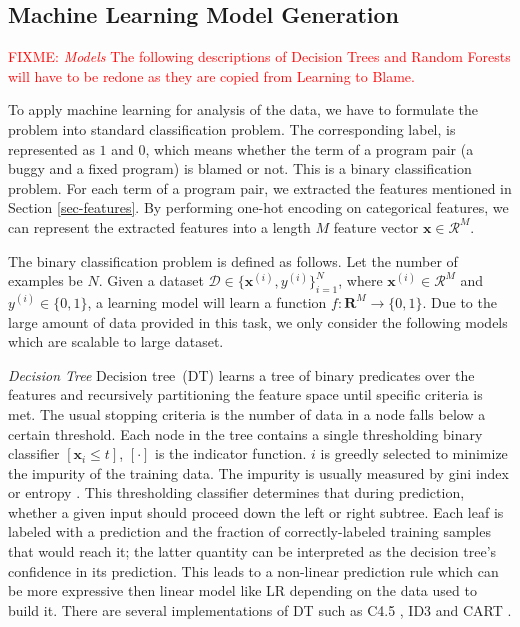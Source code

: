 \documentclass[conference]{IEEEtran}
\newcommand{\fixme}[1]{\textcolor{red}{FIXME: #1}}
\begin{document}
\subsection{Machine Learning Model Generation}
\label{sec-model}

\fixme{
\emph{Models} The following descriptions of Decision Trees and
Random Forests will have to be redone as they are copied from Learning to Blame.
}

To apply machine learning for analysis of the data, we have to formulate the
problem into standard classification problem.
The corresponding label, is represented as $1$ and $0$, which means whether
the term of a program pair (a buggy and a fixed program) is blamed or not.
This is a binary classification problem.
For each term of a program pair, we extracted the features mentioned in
Section \ref{sec-features}.
By performing one-hot encoding on categorical features, we can represent the
extracted features into a length $M$ feature vector $\mathbf{x} \in
\mathcal{R}^{M}$.

The binary classification problem is defined as follows.
Let the number of examples be $N$.
Given a dataset $\mathcal{D} \in \{\mathbf{x}^{(i)}, y^{(i)}\}^{N}_{i=1}$,
where $\mathbf{x}^{(i)} \in \mathcal{R}^{M}$ and $y^{(i)} \in \{0, 1\}$,
a learning model will learn a function $f: \mathbf{R}^{M} \to \{0, 1\}$.
Due to the large amount of data provided in this task, we only consider the
following models which are scalable to large dataset.

\emph{Decision Tree}
Decision tree~(DT) learns a tree of binary predicates over the features and
recursively partitioning the feature space until specific criteria is met.
The usual stopping criteria is the number of data in a node falls below a
certain threshold.
%
Each node in the tree contains a single thresholding binary classifier
$[ \mathbf{x}_i \leq t ]$, $[ \cdot ]$ is the indicator function.
$i$ is greedly selected to minimize the impurity of the training data.
The impurity is usually measured by gini index
\cite{breiman2017classification} or entropy \cite{quinlan1986induction}.
This thresholding classifier determines that during prediction, whether a
given input should proceed down the left or right subtree.
%
Each leaf is labeled with a prediction and the fraction of
correctly-labeled training samples that would reach it; the latter
quantity can be interpreted as the decision tree's confidence in its
prediction.
%
This leads to a non-linear prediction rule which can be more expressive
then linear model like LR depending on the data used to build it.
%
There are several implementations of DT such as C4.5 \cite{quinlan2014c4},
ID3 \cite{quinlan1986induction} and CART \cite{breiman2017classification}.
\end{document}
